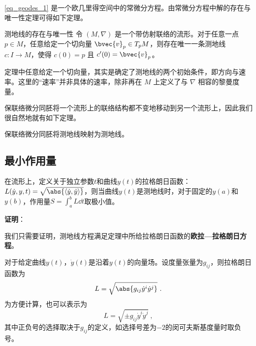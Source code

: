 \autoref{eq_geodes_1} 是一个欧几里得空间中的常微分方程。由常微分方程中解的存在与唯一性定理可得如下定理。

\begin{theorem}{测地线的存在与唯一性}
令 $(M, \nabla)$ 是一个带仿射联络的流形。对于任意一点 $p\in M$，任意给定一个切向量 $\bvec{v}_p\in T_pM$，则存在唯一一条测地线 $c:I\to M$，使得 $c(0)=p$ 且 $c'(0)=\bvec{v}_p$。
\end{theorem}

定理中任意给定一个切向量，其实是确定了测地线的两个初始条件，即方向与速率。这里的“速率”并非具体的速率，除非再在 $M$ 上定义了与 $\nabla$ 相容的黎曼度量。

保联络微分同胚将一个流形上的联络结构都不变地移动到另一个流形上，因此我们很自然地就有如下定理。

\begin{theorem}{}
保联络微分同胚将测地线映射为测地线。
\end{theorem}



\subsection{最小作用量}

\begin{theorem}{}
在流形上，定义关于独立参数$t$和曲线$y(t)$的拉格朗日函数：$L(\dot{y}, y, t) = \sqrt{\abs{\langle \dot{y}, \dot{y} \rangle}}$，则当曲线$y(t)$是测地线时，对于固定的$y(a)$和$y(b)$，作用量$S=\int_a^b L \dd t$取极小值。
\end{theorem}

\textbf{证明}：

我们只需要证明，测地线方程满足定理中所给拉格朗日函数的\textbf{欧拉—拉格朗日方程}。

对于给定曲线$y(t)$，$\dot{y}(t)$是沿着$y(t)$的向量场。设度量张量为$g_{ij}$，则拉格朗日函数为
\begin{equation}
L = \sqrt{\abs{g_{ij}\dot{y}^i\dot{y}^j}}~.
\end{equation}
为方便计算，也可以表示为
\begin{equation}
L = \sqrt{\pm{g_{ij}\dot{y}^i\dot{y}^j}}~,
\end{equation}
其中正负号的选择取决于$g_{ij}$的定义，如选择号差为$-2$的闵可夫斯基度量时取负号。

